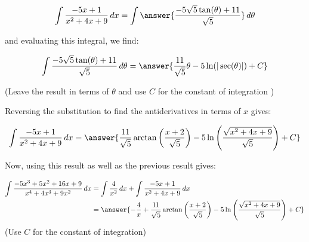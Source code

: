 \documentclass{ximera}
\begin{document}
\begin{exercise}
\begin{exercise}
\begin{exercise}
\begin{exercise}
\[
\int \frac{-5x+1}{x^2+4x+9} \d x =\int   \answer{\frac{-5\sqrt{5}\tan(\theta)+11}{\sqrt{5}}}  \d \theta
\]

and evaluating this integral, we find:


\[
\int   \frac{-5\sqrt{5}\tan(\theta)+11}{\sqrt{5}}  \d \theta = \answer{\frac{11}{\sqrt{5}}\theta -5\ln(|\sec(\theta)|)+C}
\]

(Leave the result in terms of $\theta$ and use $C$ for the constant of integration )

\begin{exercise}

Reversing the substitution to find the antiderivatives in terms of $x$ gives:

\[\int \frac{-5x+1}{x^2+4x+9} \d x =\answer{\frac{11}{\sqrt{5}}\arctan\left(\frac{x+2}{\sqrt{5}}\right)
- 5\ln\left(\frac{\sqrt{x^2+4x+9}}{\sqrt{5}}\right) + C}
\]

Now, using this result as well as the previous result gives:

\begin{align*}
\int \frac{-5x^3+5x^2+16x+9}{x^{4}+4x^3+9x^2} \d x &= \int \frac{4}{x^2} \d x + \int \frac{-5x+1}{x^2+4x+9} \d x \\
&=\answer{-\frac{4}{x}+\frac{11}{\sqrt{5}}\arctan\left(\frac{x+2}{\sqrt{5}}\right) - 5\ln\left(\frac{\sqrt{x^2+4x+9}}{\sqrt{5}}\right) + C}
\end{align*}
(Use $C$ for the constant of integration)
 

\end{exercise}
\end{exercise}
\end{exercise}
\end{exercise}
\end{exercise}
\end{document}
